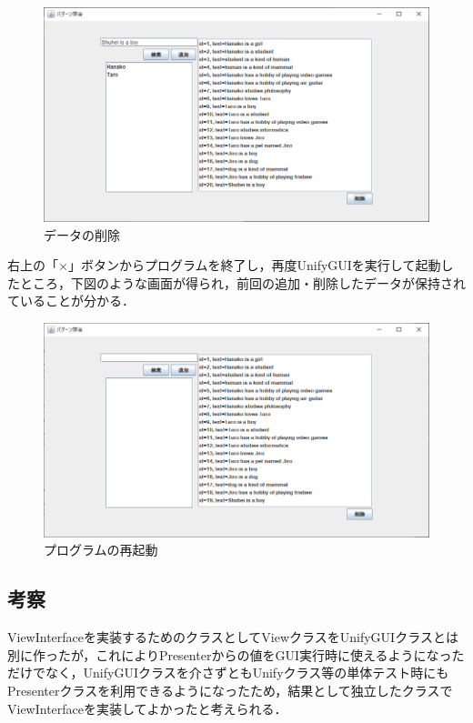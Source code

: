 \documentclass[12pt]{jarticle}
\begin{document}
\begin{figure}[!hbt]
  	\begin{center}
  		\includegraphics[scale=0.60]{images/scs2-3-4.png}
	\end{center}
  	\caption{データの削除}
\end{figure}
\clearpage

右上の「×」ボタンからプログラムを終了し，再度UnifyGUIを実行して起動したところ，下図のような画面が得られ，前回の追加・削除したデータが保持されていることが分かる．

\begin{figure}[!hbt]
  	\begin{center}
  		\includegraphics[scale=0.60]{images/scs2-3-5.png}
	\end{center}
  	\caption{プログラムの再起動}
\end{figure}
\clearpage

\subsection{考察}
ViewInterfaceを実装するためのクラスとしてViewクラスをUnifyGUIクラスとは別に作ったが，これによりPresenterからの値をGUI実行時に使えるようになっただけでなく，UnifyGUIクラスを介さずともUnifyクラス等の単体テスト時にもPresenterクラスを利用できるようになったため，結果として独立したクラスでViewInterfaceを実装してよかったと考えられる．
\end{document}
